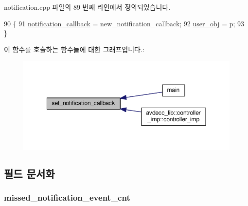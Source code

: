 notification.\+cpp 파일의 89 번째 라인에서 정의되었습니다.


\begin{DoxyCode}
90 \{
91     \hyperlink{classavdecc__lib_1_1notification_a0aaf6a2e3f6d6e3fb6b416e9c2f7f6e9}{notification\_callback} = new\_notification\_callback;
92     \hyperlink{classavdecc__lib_1_1notification_af3646c45b560aeab38e708886dec0d93}{user\_obj} = p;
93 \}
\end{DoxyCode}


이 함수를 호출하는 함수들에 대한 그래프입니다.\+:
\nopagebreak
\begin{figure}[H]
\begin{center}
\leavevmode
\includegraphics[width=349pt]{classavdecc__lib_1_1notification_abdf19db77644e724db59c66a2cf7c5fb_icgraph}
\end{center}
\end{figure}




\subsection{필드 문서화}
\subsubsection[{\texorpdfstring{missed\+\_\+notification\+\_\+event\+\_\+cnt}{missed_notification_event_cnt}}]{ missed\+\_\+notification\+\_\+event\+\_\+cnt\hspace{0.3cm}{\ttfamily [protected]}}\hypertarget{classavdecc__lib_1_1notification_a55b9ebbf69af44fa3923a8da478f9b27}{}\label{classavdecc__lib_1_1notification_a55b9ebbf69af44fa3923a8da478f9b27}


